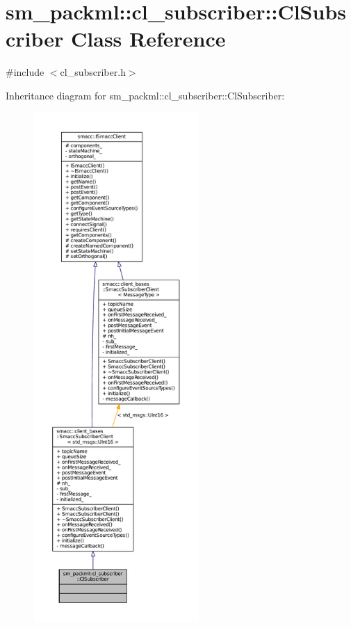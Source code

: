 \hypertarget{classsm__packml_1_1cl__subscriber_1_1ClSubscriber}{}\section{sm\+\_\+packml\+:\+:cl\+\_\+subscriber\+:\+:Cl\+Subscriber Class Reference}
\label{classsm__packml_1_1cl__subscriber_1_1ClSubscriber}


{\ttfamily \#include $<$cl\+\_\+subscriber.\+h$>$}



Inheritance diagram for sm\+\_\+packml\+:\+:cl\+\_\+subscriber\+:\+:Cl\+Subscriber\+:
\nopagebreak
\begin{figure}[H]
\begin{center}
\leavevmode
\includegraphics[height=550pt]{classsm__packml_1_1cl__subscriber_1_1ClSubscriber__inherit__graph}
\end{center}
\end{figure}


